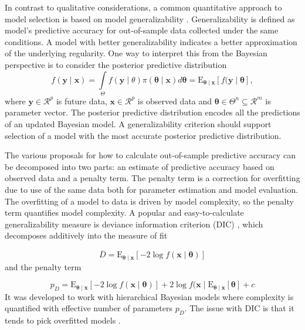 \documentclass[12pt]{article}
\begin{document}
	In contrast to qualitative considerations, a common quantitative approach to model selection is based on model generalizability \citep{GelHwa2013}. Generalizability is defined as model’s predictive accuracy for out-of-sample data collected under the same conditions. A model with better generalizability indicates a better approximation of the underlying regularity. One way to interpret this from the Bayesian perspective is to consider the posterior predictive distribution 
\begin{equation}
f(\boldsymbol{y} \mid \boldsymbol{x}) = \int\limits_{\Theta} f(\boldsymbol{y} \mid \theta)\pi(\boldsymbol{\theta} \mid \boldsymbol{x})d\boldsymbol{\theta} = \operatorname{E_{\boldsymbol{\theta} \mid \boldsymbol{x}}}[f(\boldsymbol{y} \mid \boldsymbol{\theta}],
\end{equation}
where $\boldsymbol{y} \in \mathcal{R}^p$ is future data, $\boldsymbol{x} \in \mathcal{R}^p$ is observed data and $\boldsymbol{\theta} \in \Theta^n \subseteq \mathcal{R}^m$ is parameter vector. The posterior predictive distribution encodes all the predictions of an updated Bayesian model. A generalizability criterion should support selection of a model with the most accurate posterior predictive distribution.

	The various proposals for how to calculate out-of-sample predictive accuracy can be decomposed into two parts: an estimate of predictive accuracy based on observed data and a penalty term. The penalty term is a correction for overfitting due to use of the same data both for parameter estimation and model evaluation. The overfitting of a model to data is driven by model complexity, so the penalty term quantifies model complexity. A popular and easy-to-calculate generalizability measure is deviance information criterion (DIC) \citep{SpiBes2002}, which decomposes additively into the measure of fit

\begin{equation}
\overline D = \operatorname{E_{\boldsymbol{\theta} \mid \boldsymbol{x}}}[-2\operatorname{log}f(\boldsymbol{x} \mid \boldsymbol{\theta})]
\end{equation}
and the penalty term

\begin{equation}
p_D = \operatorname{E_{\boldsymbol{\theta} \mid \boldsymbol{x}}}[-2\operatorname{log}f(\boldsymbol{x} \mid \boldsymbol{\theta})] + 2\operatorname{log}f(\boldsymbol{x} \mid \operatorname{E_{\boldsymbol{\theta} \mid \boldsymbol{x}}}[\boldsymbol{\theta}] + c
\end{equation}
It was developed to work with hierarchical Bayesian models where complexity is quantified with effective number of parameters $p_D$. The issue with DIC is that it tends to pick overfitted models \citep{GelHwa2013}. 
\end{document}

